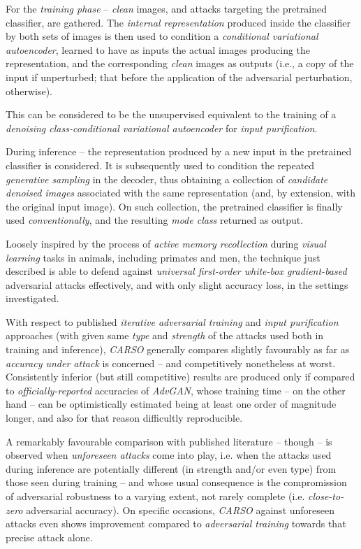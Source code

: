 For the \textit{training phase} – \textit{clean} images, and attacks targeting the pretrained classifier, are gathered. The \textit{internal representation} produced inside the classifier by both sets of images is then used to condition a \textit{conditional variational autoencoder}, learned to have as inputs the actual images producing the representation, and the corresponding \textit{clean} images as outputs (i.e., a copy of the input if unperturbed; that before the application of the adversarial perturbation, otherwise).

This can be considered to be the unsupervised equivalent to the training of a \textit{denoising class-conditional variational autoencoder} for \textit{input purification}.

During inference – the representation produced by a new input in the pretrained classifier is considered. It is subsequently used to condition the repeated \textit{generative sampling} in the decoder, thus obtaining a collection of \textit{candidate denoised images} associated with the same representation (and, by extension, with the original input image). On such collection, the pretrained classifier is finally used \textit{conventionally}, and the resulting \textit{mode class} returned as output.

Loosely inspired by the process of \textit{active memory recollection} during \textit{visual learning} tasks in animals, including primates and men, the technique just described is able to defend against \textit{universal first-order white-box gradient-based} adversarial attacks effectively, and with only slight accuracy loss, in the settings investigated.

With respect to published \textit{iterative adversarial training} and \textit{input purification} approaches (with given same \textit{type} and \textit{strength} of the attacks used both in training and inference), \textit{CARSO} generally compares slightly favourably as far as \textit{accuracy under attack} is concerned – and competitively nonetheless at worst. Consistently inferior (but still competitive) results are produced only if compared to \textit{officially-reported} accuracies of \textit{AdvGAN}, whose training time – on the other hand – can be optimistically estimated being at least one order of magnitude longer, and also for that reason difficultly reproducible.

A remarkably favourable comparison with published literature – though – is observed when \textit{unforeseen attacks} come into play, i.e. when the attacks used during inference are potentially different (in strength and/or even type) from those seen during training – and whose usual consequence is the compromission of adversarial robustness to a varying extent, not rarely complete (i.e. \textit{close-to-zero} adversarial accuracy). On specific occasions, \textit{CARSO} against unforeseen attacks even shows improvement compared to \textit{adversarial training} towards that precise attack alone.

